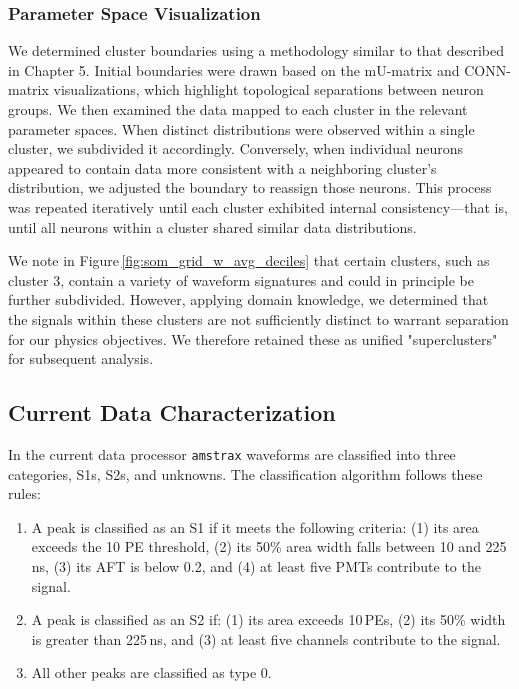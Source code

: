 \subsubsection{Parameter Space Visualization}

We determined cluster boundaries using a methodology similar to that described in Chapter 5. Initial boundaries were drawn based on the mU-matrix and CONN-matrix visualizations, which highlight topological separations between neuron groups. We then examined the data mapped to each cluster in the relevant parameter spaces. When distinct distributions were observed within a single cluster, we subdivided it accordingly. Conversely, when individual neurons appeared to contain data more consistent with a neighboring cluster's distribution, we adjusted the boundary to reassign those neurons. This process was repeated iteratively until each cluster exhibited internal consistency—that is, until all neurons within a cluster shared similar data distributions.


We note in Figure\,\ref{fig:som_grid_w_avg_deciles} that certain clusters, such as cluster 3, contain a variety of waveform signatures and could in principle be further subdivided. However, applying domain knowledge, we determined that the signals within these clusters are not sufficiently distinct to warrant separation for our physics objectives. We therefore retained these as unified "superclusters" for subsequent analysis.



\subsection{Current Data 
Characterization }
\label{sec:previous_classification}



In the current data processor \texttt{amstrax} waveforms are classified into three categories, S1s, S2s, and unknowns. The classification algorithm follows these rules:

\begin{enumerate}
    \item A peak is classified as an S1 if it meets the following criteria: (1) its area exceeds the 10 PE threshold, (2) its 50\% area width falls between 10 and 225\,ns, (3) its AFT is below 0.2, and (4) at least five PMTs contribute to the signal.
    \item A peak is classified as an S2 if: (1) its area exceeds 10\,PEs, (2) its 50\% width is greater than 225\,ns, and (3) at least five channels contribute to the signal.
    \item All other peaks are classified as type 0.
\end{enumerate}


